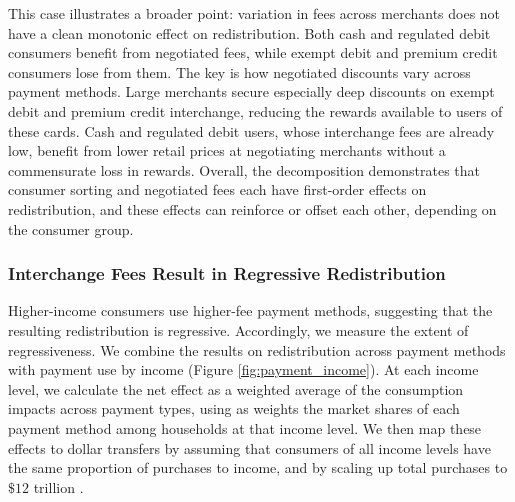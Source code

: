 \documentclass[main.tex]{subfiles}
\begin{document}
This case illustrates a broader point: variation in fees across merchants does not have a clean monotonic effect on redistribution.
Both cash and regulated debit consumers benefit from negotiated fees, while exempt debit and premium credit consumers lose from them.
The key is how negotiated discounts vary across payment methods.
Large merchants secure especially deep discounts on exempt debit and premium credit interchange, reducing the rewards available to users of these cards.
Cash and regulated debit users, whose interchange fees are already low, benefit from lower retail prices at negotiating merchants without a commensurate loss in rewards.
Overall, the decomposition demonstrates that consumer sorting and negotiated fees each have first-order effects on redistribution, and these effects can reinforce or offset each other, depending on the consumer group.

\subsubsection{Interchange Fees Result in Regressive Redistribution}

Higher-income consumers use higher-fee payment methods, suggesting that the resulting redistribution is regressive.
Accordingly, we measure the extent of regressiveness.
We combine the results on redistribution across payment methods with payment use by income (Figure \ref{fig:payment_income}).
At each income level, we calculate the net effect as a weighted average of the consumption impacts across payment types, using as weights the market shares of each payment method among households at that income level.
We then map these effects to dollar transfers by assuming that consumers of all income levels have the same proportion of purchases to income, and by scaling up total purchases to $\$12$ trillion \citep{Nilson2023a}.
\end{document}
